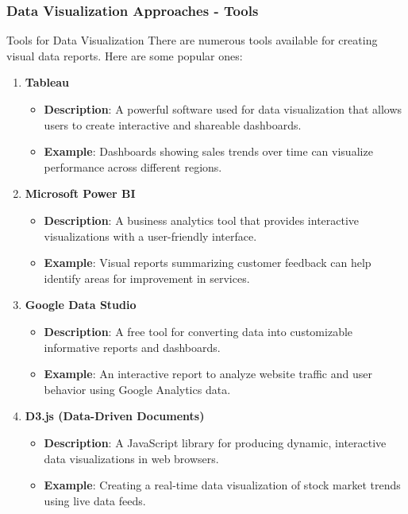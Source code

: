 \documentclass{beamer}
\begin{document}
\begin{frame}[fragile]
    \frametitle{Data Visualization Approaches - Tools}
    
    \begin{block}{Tools for Data Visualization}
        There are numerous tools available for creating visual data reports. Here are some popular ones:
    \end{block}
    
    \begin{enumerate}
        \item \textbf{Tableau}
            \begin{itemize}
                \item \textbf{Description}: A powerful software used for data visualization that allows users to create interactive and shareable dashboards.
                \item \textbf{Example}: Dashboards showing sales trends over time can visualize performance across different regions.
            \end{itemize} 

        \item \textbf{Microsoft Power BI}
            \begin{itemize}
                \item \textbf{Description}: A business analytics tool that provides interactive visualizations with a user-friendly interface.
                \item \textbf{Example}: Visual reports summarizing customer feedback can help identify areas for improvement in services.
            \end{itemize}

        \item \textbf{Google Data Studio}
            \begin{itemize}
                \item \textbf{Description}: A free tool for converting data into customizable informative reports and dashboards.
                \item \textbf{Example}: An interactive report to analyze website traffic and user behavior using Google Analytics data.
            \end{itemize}

        \item \textbf{D3.js (Data-Driven Documents)}
            \begin{itemize}
                \item \textbf{Description}: A JavaScript library for producing dynamic, interactive data visualizations in web browsers.
                \item \textbf{Example}: Creating a real-time data visualization of stock market trends using live data feeds.
            \end{itemize}


\end{enumerate}
\end{frame}
\end{document}

